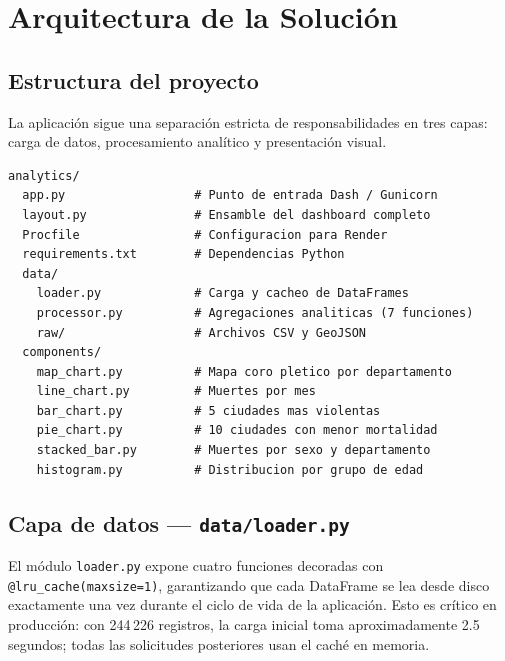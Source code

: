 \documentclass[a4paper,12pt]{report}
\numberwithin{equation}{chapter}
\numberwithin{figure}{chapter}
\numberwithin{table}{chapter}
\begin{document}
\chapter{Arquitectura de la Solución}\label{chap:arquitectura}

\section{Estructura del proyecto}

La aplicación sigue una separación estricta de responsabilidades en tres capas: carga de datos, procesamiento analítico y presentación visual.

\begin{lstlisting}[language={}, caption={Estructura de archivos del proyecto}, label={lst:tree}]
analytics/
  app.py                  # Punto de entrada Dash / Gunicorn
  layout.py               # Ensamble del dashboard completo
  Procfile                # Configuracion para Render
  requirements.txt        # Dependencias Python
  data/
    loader.py             # Carga y cacheo de DataFrames
    processor.py          # Agregaciones analiticas (7 funciones)
    raw/                  # Archivos CSV y GeoJSON
  components/
    map_chart.py          # Mapa coro pletico por departamento
    line_chart.py         # Muertes por mes
    bar_chart.py          # 5 ciudades mas violentas
    pie_chart.py          # 10 ciudades con menor mortalidad
    stacked_bar.py        # Muertes por sexo y departamento
    histogram.py          # Distribucion por grupo de edad
\end{lstlisting}

\section{Capa de datos — \texttt{data/loader.py}}

El módulo \texttt{loader.py} expone cuatro funciones decoradas con \texttt{@lru\_cache(maxsize=1)}, garantizando que cada DataFrame se lea desde disco exactamente una vez durante el ciclo de vida de la aplicación. Esto es crítico en producción: con 244\,226 registros, la carga inicial toma aproximadamente 2.5 segundos; todas las solicitudes posteriores usan el caché en memoria.


\end{document}
